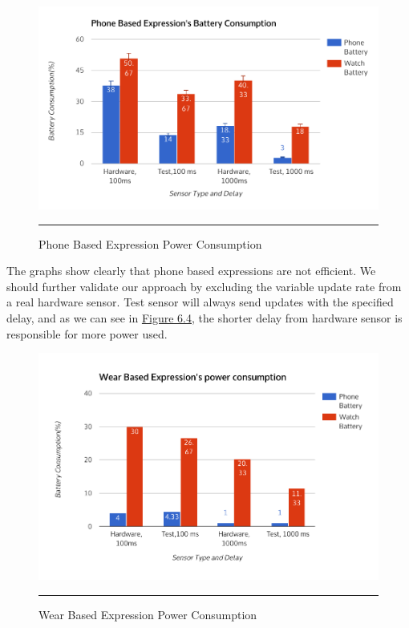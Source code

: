  \begin{figure}[htbp]
  \centering
    \includegraphics[scale=0.8]{Figures/phone_expr_consumption.pdf}
    \rule{35em}{0.5pt}
  \caption[Phone Based Expression Power Consumption]{Phone Based Expression Power Consumption}
  \label{fig:phone_expr_consumption}
\end{figure}

The graphs show clearly that phone based expressions are not efficient.  We should further validate our approach by excluding the variable update rate from a real hardware sensor.
Test sensor will always send updates with the specified delay, and as we can see in \hyperref[fig:phone_expr_consumption]{Figure 6.4}, the shorter delay from hardware sensor is responsible
for more power used.

 \begin{figure}[htbp]
  \centering
    \includegraphics[scale=0.8]{Figures/wear_expr_consumption.pdf}
    \rule{35em}{0.5pt}
  \caption[Wear Based Expression Power Consumption]{Wear Based Expression Power Consumption}
  \label{fig:wear_expr_consumption}
\end{figure}

